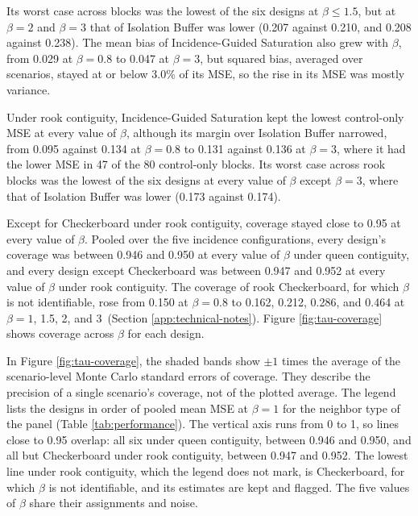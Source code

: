 \documentclass[11pt]{article}
\begin{document}
Its worst case across
blocks was the lowest of the six designs at \(\beta \le 1.5\), but at
\(\beta = 2\) and \(\beta = 3\) that of Isolation Buffer was lower (0.207
against 0.210, and 0.208 against 0.238). The mean bias of
Incidence-Guided Saturation also grew with \(\beta\), from
0.029 at \(\beta = 0.8\) to 0.047 at \(\beta = 3\), but squared bias,
averaged over scenarios, stayed at or below 3.0\% of its MSE, so the
rise in its MSE was mostly variance.

Under rook contiguity, Incidence-Guided Saturation kept the
lowest control-only MSE at every value of \(\beta\), although its margin
over Isolation Buffer narrowed, from 0.095 against 0.134 at
\(\beta = 0.8\) to 0.131 against 0.136 at \(\beta = 3\), where it had the
lower MSE in 47 of the 80 control-only blocks. Its worst case across
rook blocks was the lowest of the six designs at every value of \(\beta\)
except \(\beta = 3\), where that of Isolation Buffer was lower (0.173
against 0.174).

Except for Checkerboard under rook contiguity, coverage stayed close to 0.95 at every value of \(\beta\). Pooled over the five incidence
configurations, every design's coverage was between 0.946 and 0.950 at every value of \(\beta\) under queen contiguity, and every design except Checkerboard was between 0.947 and 0.952 at every value of \(\beta\)
under rook contiguity. The coverage of rook Checkerboard, for which
\(\beta\) is not identifiable, rose from 0.150 at \(\beta = 0.8\) to 0.162, 0.212, 0.286, and 0.464 at \(\beta = 1\), 1.5, 2, and 3\iffullsi\ (Section
\ref{app:technical-notes})\fi. \iffullsi Figure \ref{fig:tau-coverage} shows
coverage across \(\beta\) for each design.\fi

\iffullsi
In Figure \ref{fig:tau-coverage}, the shaded bands show \(\pm 1\) times the average of the
scenario-level Monte Carlo standard errors of coverage. They describe
the precision of a single scenario's coverage, not of the plotted
average. The legend lists the designs in order of pooled mean MSE at
\(\beta = 1\) for the neighbor type of the panel (Table
\ref{tab:performance}). The vertical axis runs from 0 to 1, so lines
close to 0.95 overlap: all six under queen contiguity, between 0.946 and 0.950, and all but Checkerboard under rook contiguity, between 0.947 and 0.952. The lowest line under rook contiguity, which the legend does not
mark, is Checkerboard, for which \(\beta\) is not identifiable, and its
estimates are kept and flagged. The five values of \(\beta\) share their
assignments and noise.
\fi
\end{document}
